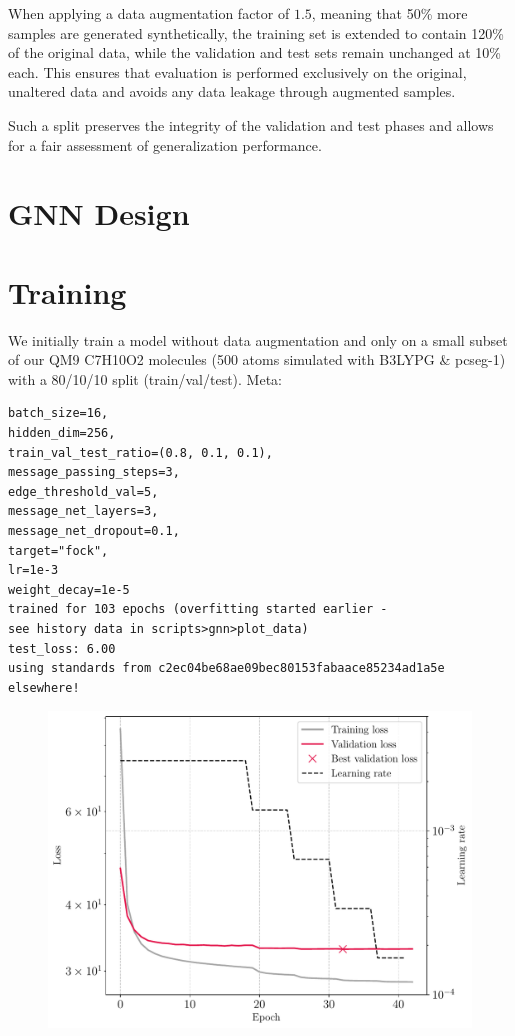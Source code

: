 When applying a data augmentation factor of $1.5$, meaning that 50\% more samples are generated synthetically, the training set is extended to contain 120\% of the original data, while the validation and test sets remain unchanged at 10\% each. This ensures that evaluation is performed exclusively on the original, unaltered data and avoids any data leakage through augmented samples.

Such a split preserves the integrity of the validation and test phases and allows for a fair assessment of generalization performance.

\section{GNN Design}
\label{sec:gnn_design}


\section{Training}
\label{sec:gnn_training}
We initially train a model without data augmentation and only on a small subset of our QM9 C7H10O2 molecules (500 atoms simulated with B3LYPG \& pcseg-1) with a 80/10/10 split (train/val/test). 
Meta: 
\begin{verbatim}
batch_size=16,
hidden_dim=256,
train_val_test_ratio=(0.8, 0.1, 0.1),
message_passing_steps=3,
edge_threshold_val=5,
message_net_layers=3,
message_net_dropout=0.1,
target="fock",
lr=1e-3 
weight_decay=1e-5
trained for 103 epochs (overfitting started earlier - 
see history data in scripts>gnn>plot_data)
test_loss: 6.00
using standards from c2ec04be68ae09bec80153fabaace85234ad1a5e elsewhere!
\end{verbatim}
        
\begin{figure}[H]
    \centering
    \includegraphics[width=\textwidth]{../fig/gnn/mgnn_pcseg1_simple_loss.pdf}
    \caption[GNN initial training Loss]{}
    \label{fig:gnn_initial_training_loss}
\end{figure}